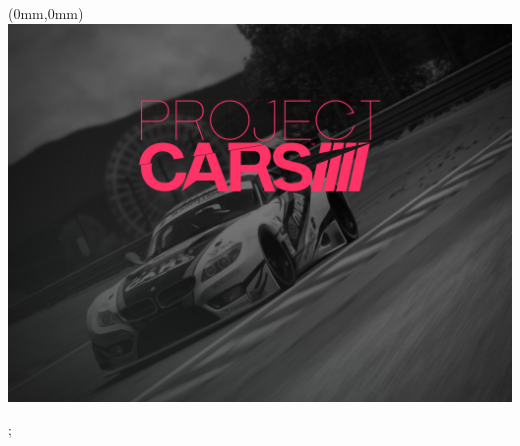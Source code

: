 \documentclass[oneside, a4paper, 12pt]{book}
\begin{document}
\selectfont
\textblockorigin{0cm}{0cm}


\newlength{\Logo}
\setlength{\Logo}{210mm}
\begin{textblock*}{\Logo}(0mm,0mm)%
\includegraphics[width=\Logo]{pcars-main.png}
\end{textblock*}

\setlength{\Logo}{30mm}
 
;

\end{document}
